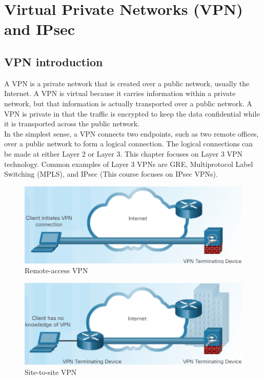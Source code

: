 \chapter{Virtual Private Networks (VPN) and IPsec}

\section{VPN introduction}

A VPN is a private network that is created over a public network, usually the Internet. A VPN is virtual because it carries information within a private network, but that information is actually transported over a public network. A VPN is private in that the traffic is encrypted to keep the data confidential while it is transported across the public network.\\

In the simplest sense, a VPN connects two endpoints, such as two remote offices, over a public network to form a logical connection. The logical connections can be made at either Layer 2 or Layer 3. This chapter focuses on Layer 3 VPN technology. Common examples of Layer 3 VPNs are GRE, Multiprotocol Label Switching (MPLS), and IPsec (This course focuses on IPsec VPNs).\\

\begin{figure}[hbtp]
\caption{Remote-access VPN}\label{RemoteVPN}
\centering
\includegraphics[scale=0.5]{pictures/RemoteVPN.PNG}
\end{figure}

\begin{figure}[hbtp]
\caption{Site-to-site VPN}\label{Site2site}
\centering
\includegraphics[scale=0.5]{pictures/Site2site.PNG}
\end{figure}


